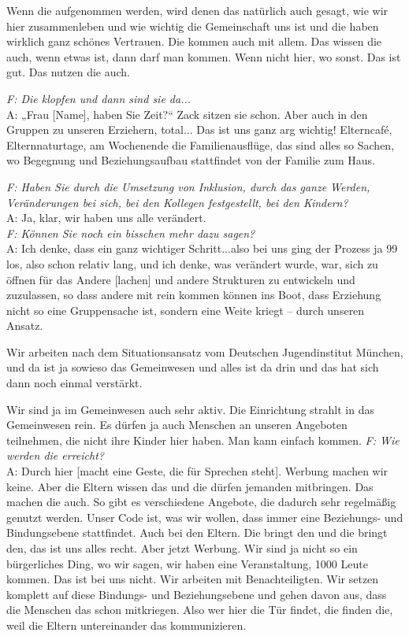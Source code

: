 \begin{linenumbers*}
Wenn die aufgenommen werden, wird denen das natürlich auch gesagt, wie wir hier zusammenleben und wie wichtig die Gemeinschaft uns ist und die haben wirklich ganz schönes Vertrauen. Die kommen auch mit allem. Das wissen die auch, wenn etwas ist, dann darf man kommen. Wenn nicht hier, wo sonst. Das ist gut. Das nutzen die auch. 

\emph{F: Die klopfen und dann sind sie da...}\\
A: „Frau [Name], haben Sie Zeit?“ Zack sitzen sie schon. Aber auch in den Gruppen zu unseren Erziehern, total... Das ist uns ganz arg wichtig!
Elterncafé, Elternnaturtage, am Wochenende die Familienausflüge, das sind alles so Sachen, wo Begegnung und Beziehungsaufbau stattfindet von der Familie zum Haus. 
 
\emph{F: Haben Sie durch die Umsetzung von Inklusion, durch das ganze Werden, Veränderungen bei sich, bei den Kollegen festgestellt, bei den Kindern?}\\
A: Ja, klar, wir haben uns alle verändert.\\ 
\emph{F: Können Sie noch ein bisschen mehr dazu sagen?}\\
A: Ich denke, dass ein ganz wichtiger Schritt...also bei uns ging der Prozess ja 99 los, also schon relativ lang, und ich denke, was verändert wurde, war, sich zu öffnen für das Andere [lachen] und andere Strukturen zu entwickeln und zuzulassen, so dass andere mit rein kommen können ins Boot, dass Erziehung nicht so eine Gruppensache ist, sondern eine Weite kriegt -- durch unseren Ansatz. 

Wir arbeiten nach dem Situationsansatz vom Deutschen Jugendinstitut München, und da ist ja sowieso das Gemeinwesen und alles ist da drin und das hat sich dann noch einmal verstärkt. 

Wir sind ja im Gemeinwesen auch sehr aktiv. Die Einrichtung strahlt in das Gemeinwesen rein. Es dürfen ja auch Menschen an unseren Angeboten teilnehmen, die nicht ihre Kinder hier haben. Man kann einfach kommen.
\emph{F: Wie werden die erreicht?}\\
A: Durch hier [macht eine Geste, die für Sprechen steht]. Werbung machen wir keine. Aber die Eltern wissen das und die dürfen jemanden mitbringen. Das machen die auch. So gibt es verschiedene Angebote, die dadurch sehr regelmäßig genutzt werden. Unser Code ist, was wir wollen, dass immer eine Beziehungs- und Bindungsebene stattfindet. Auch bei den Eltern. Die bringt den und die bringt den, das ist uns alles recht. Aber jetzt Werbung. Wir sind ja nicht so ein bürgerliches Ding, wo wir sagen, wir haben eine Veranstaltung, 1000 Leute kommen. Das ist bei uns nicht. Wir arbeiten mit Benachteiligten. Wir setzen komplett auf diese Bindungs- und Beziehungsebene und gehen davon aus, dass die Menschen das schon mitkriegen. Also wer hier die Tür findet, die finden die, weil die Eltern untereinander das kommunizieren. 


\end{linenumbers*}
